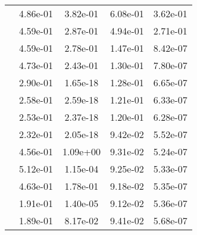 \begin{table}
\begin{tabular}{c|cc|cc|}
\multicolumn{1}{|c|}{} & \multicolumn{1}{|c|}{  4.86e-01} & \multicolumn{1}{|c|}{  3.82e-01} & \multicolumn{1}{|c|}{  6.08e-01} & \multicolumn{1}{|c|}{  3.62e-01} \\ 
\multicolumn{1}{|c|}{} & \multicolumn{1}{|c|}{  4.59e-01} & \multicolumn{1}{|c|}{  2.87e-01} & \multicolumn{1}{|c|}{  4.94e-01} & \multicolumn{1}{|c|}{  2.71e-01} \\ 
\multicolumn{1}{|c|}{} & \multicolumn{1}{|c|}{  4.59e-01} & \multicolumn{1}{|c|}{  2.78e-01} & \multicolumn{1}{|c|}{  1.47e-01} & \multicolumn{1}{|c|}{  8.42e-07} \\ 
\multicolumn{1}{|c|}{} & \multicolumn{1}{|c|}{  4.73e-01} & \multicolumn{1}{|c|}{  2.43e-01} & \multicolumn{1}{|c|}{  1.30e-01} & \multicolumn{1}{|c|}{  7.80e-07} \\ 
\multicolumn{1}{|c|}{} & \multicolumn{1}{|c|}{  2.90e-01} & \multicolumn{1}{|c|}{  1.65e-18} & \multicolumn{1}{|c|}{  1.28e-01} & \multicolumn{1}{|c|}{  6.65e-07} \\ 
\multicolumn{1}{|c|}{} & \multicolumn{1}{|c|}{  2.58e-01} & \multicolumn{1}{|c|}{  2.59e-18} & \multicolumn{1}{|c|}{  1.21e-01} & \multicolumn{1}{|c|}{  6.33e-07} \\ 
\multicolumn{1}{|c|}{} & \multicolumn{1}{|c|}{  2.53e-01} & \multicolumn{1}{|c|}{  2.37e-18} & \multicolumn{1}{|c|}{  1.20e-01} & \multicolumn{1}{|c|}{  6.28e-07} \\ 
\multicolumn{1}{|c|}{} & \multicolumn{1}{|c|}{  2.32e-01} & \multicolumn{1}{|c|}{  2.05e-18} & \multicolumn{1}{|c|}{  9.42e-02} & \multicolumn{1}{|c|}{  5.52e-07} \\ 
\multicolumn{1}{|c|}{} & \multicolumn{1}{|c|}{  4.56e-01} & \multicolumn{1}{|c|}{  1.09e+00} & \multicolumn{1}{|c|}{  9.31e-02} & \multicolumn{1}{|c|}{  5.24e-07} \\ 
\multicolumn{1}{|c|}{} & \multicolumn{1}{|c|}{  5.12e-01} & \multicolumn{1}{|c|}{  1.15e-04} & \multicolumn{1}{|c|}{  9.25e-02} & \multicolumn{1}{|c|}{  5.33e-07} \\ 
\multicolumn{1}{|c|}{} & \multicolumn{1}{|c|}{  4.63e-01} & \multicolumn{1}{|c|}{  1.78e-01} & \multicolumn{1}{|c|}{  9.18e-02} & \multicolumn{1}{|c|}{  5.35e-07} \\ 
\multicolumn{1}{|c|}{} & \multicolumn{1}{|c|}{  1.91e-01} & \multicolumn{1}{|c|}{  1.40e-05} & \multicolumn{1}{|c|}{  9.12e-02} & \multicolumn{1}{|c|}{  5.36e-07} \\ 
\multicolumn{1}{|c|}{} & \multicolumn{1}{|c|}{  1.89e-01} & \multicolumn{1}{|c|}{  8.17e-02} & \multicolumn{1}{|c|}{  9.41e-02} & \multicolumn{1}{|c|}{  5.68e-07} \\ 

\end{tabular}
\end{table}
